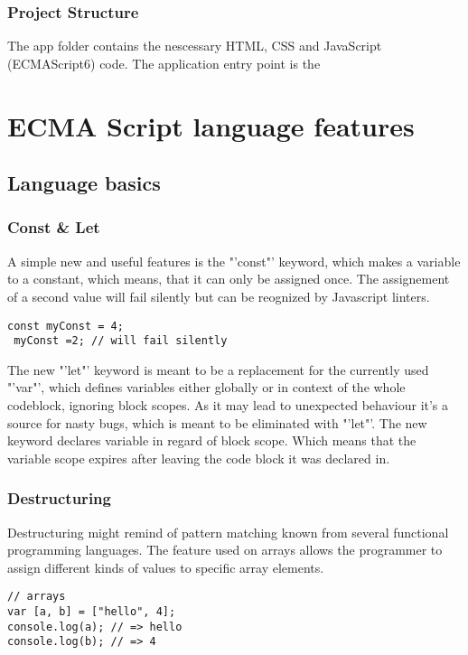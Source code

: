 \documentclass{bioinfo}
\begin{document}
\subsubsection{Project Structure} 
The app folder contains the nescessary HTML, CSS and JavaScript (ECMAScript6) code. The application entry point is the 

\section{ECMA Script language features}

\subsection{Language basics}

\subsubsection{Const \& Let}
A simple new and useful features is the "'const"' keyword, which makes a variable to a constant, which means, 
that it can only be assigned once. The assignement of a second value will fail silently but can be reognized by
Javascript linters.
\begin{lstlisting}[caption= My Javascript Example]
const myConst = 4;
 myConst =2; // will fail silently
\end{lstlisting}

The new "'let"' keyword is meant to be a replacement for the currently used "'var"', which defines variables 
either globally or in context of the whole codeblock, ignoring block scopes. As it may lead to unexpected behaviour
it's a source for nasty bugs, which is meant to be eliminated with "'let"'. The new keyword declares variable in 
regard of block scope. Which means that the variable scope expires after leaving the code block it was declared in.


\subsubsection{Destructuring}
Destructuring might remind of pattern matching known from several functional programming languages.
The feature used on arrays allows the programmer to assign different kinds of values to specific array elements.
\begin{lstlisting}[caption= My Javascript Example]
// arrays
var [a, b] = ["hello", 4];
console.log(a); // => hello
console.log(b); // => 4
\end{lstlisting}
\end{document}

